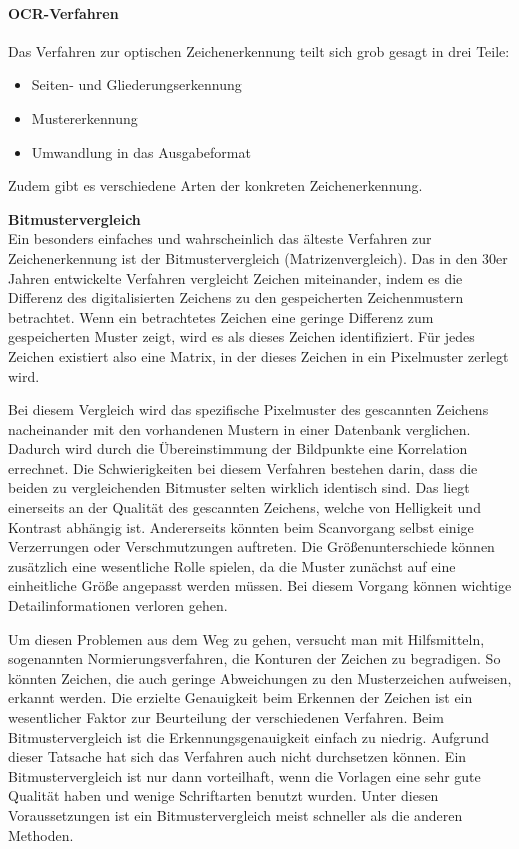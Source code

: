 \paragraph{OCR-Verfahren}
Das Verfahren zur optischen Zeichenerkennung teilt sich grob gesagt in drei Teile:
\begin{itemize}
\item Seiten- und Gliederungserkennung
\item Mustererkennung
\item Umwandlung in das Ausgabeformat
\end{itemize}
Zudem gibt es verschiedene Arten der konkreten Zeichenerkennung. \cite{OCRB}

\textbf{Bitmustervergleich}\\
Ein besonders einfaches und wahrscheinlich das älteste Verfahren zur Zeichenerkennung ist der Bitmustervergleich (Matrizenvergleich). Das in den 30er Jahren entwickelte Verfahren vergleicht Zeichen miteinander, indem es die Differenz des digitalisierten Zeichens zu den gespeicherten Zeichenmustern betrachtet. Wenn ein betrachtetes Zeichen eine geringe Differenz zum gespeicherten Muster zeigt, wird es als dieses Zeichen identifiziert. Für jedes Zeichen existiert also eine Matrix, in der dieses Zeichen in ein Pixelmuster zerlegt wird. \cite{OCRB}


Bei diesem Vergleich wird das spezifische Pixelmuster des gescannten Zeichens nacheinander mit den vorhandenen Mustern in einer Datenbank verglichen. Dadurch wird durch die Übereinstimmung der Bildpunkte eine Korrelation errechnet. Die Schwierigkeiten bei diesem Verfahren bestehen darin, dass die beiden zu vergleichenden Bitmuster selten wirklich identisch sind. Das liegt einerseits an der Qualität des gescannten Zeichens, welche von Helligkeit und Kontrast abhängig ist. Andererseits könnten beim Scanvorgang selbst einige Verzerrungen oder Verschmutzungen auftreten. Die Größenunterschiede können zusätzlich eine wesentliche Rolle spielen, da die Muster zunächst auf eine einheitliche Größe angepasst werden müssen. Bei diesem Vorgang können wichtige Detailinformationen verloren gehen. \cite{OCRB}

Um diesen Problemen aus dem Weg zu gehen, versucht man mit Hilfsmitteln, sogenannten Normierungsverfahren, die Konturen der Zeichen zu begradigen. So könnten Zeichen, die auch geringe Abweichungen zu den Musterzeichen aufweisen, erkannt werden. Die erzielte Genauigkeit beim Erkennen der Zeichen ist ein wesentlicher Faktor zur Beurteilung der verschiedenen Verfahren. Beim Bitmustervergleich ist die Erkennungsgenauigkeit einfach zu niedrig. Aufgrund dieser Tatsache hat sich das Verfahren auch nicht durchsetzen können. Ein Bitmustervergleich ist nur dann vorteilhaft, wenn die Vorlagen eine sehr gute Qualität haben und wenige Schriftarten benutzt wurden. Unter diesen Voraussetzungen ist ein Bitmustervergleich meist schneller als die anderen Methoden. \cite{OCRB}

